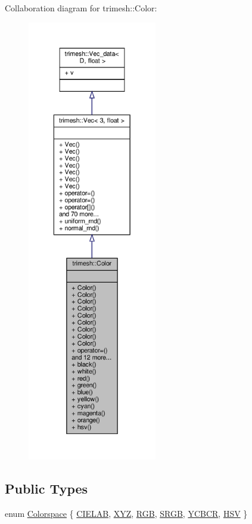 Collaboration diagram for trimesh\+:\+:Color\+:\nopagebreak
\begin{figure}[H]
\begin{center}
\leavevmode
\includegraphics[height=550pt]{dd/daa/classtrimesh_1_1Color__coll__graph}
\end{center}
\end{figure}
\subsection*{Public Types}
\begin{DoxyCompactItemize}
\item 
enum \hyperlink{classtrimesh_1_1Color_a2e472a2f6056fb5d0d835ee1c361b6da}{Colorspace} \{ \newline
\hyperlink{classtrimesh_1_1Color_a2e472a2f6056fb5d0d835ee1c361b6daa34378035ef639b94005f8a3f00ac9388}{C\+I\+E\+L\+AB}, 
\hyperlink{classtrimesh_1_1Color_a2e472a2f6056fb5d0d835ee1c361b6daabb45b461ca3718a56a106ac7cc0b01d4}{X\+YZ}, 
\hyperlink{classtrimesh_1_1Color_a2e472a2f6056fb5d0d835ee1c361b6daabd359b28fff9f9d21986cac01d02fc9e}{R\+GB}, 
\hyperlink{classtrimesh_1_1Color_a2e472a2f6056fb5d0d835ee1c361b6daa09ccc9ca587a8056b9552ec4dff53fd4}{S\+R\+GB}, 
\newline
\hyperlink{classtrimesh_1_1Color_a2e472a2f6056fb5d0d835ee1c361b6daa61362689388b942d9d7fea6ddc74db63}{Y\+C\+B\+CR}, 
\hyperlink{classtrimesh_1_1Color_a2e472a2f6056fb5d0d835ee1c361b6daa5239e1d12b6fbaab60f8b57960f2168b}{H\+SV}
 \}
\end{DoxyCompactItemize}
